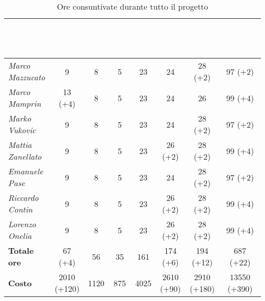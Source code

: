\begin{table}[H]
    \renewcommand\arraystretch{1.4}
    \footnotesize
    \centering
        \begin{tabular}{|l|c|c|c|c|c|c|c|}
            \hline
            \rowcolor[HTML]{036400}
            \textcolor{white}{\textbf{Membro}} & \multicolumn{1}{c|}{\textcolor{white}{\textbf{RE}}} & \multicolumn{1}{c|}{\textcolor{white}{\textbf{AM}}} & \multicolumn{1}{c|}{\textcolor{white}{\textbf{AN}}} & \multicolumn{1}{c|}{\textcolor{white}{\textbf{PT}}} & \multicolumn{1}{c|}{\textcolor{white}{\textbf{PR}}} & \multicolumn{1}{c|}{\textcolor{white}{\textbf{VE}}} & \multicolumn{1}{c|}{\textcolor{white}{\textbf{Totale ore persona}}} \\ \hline
            \rowcolor[HTML]{EFEFEF}\textit{Marco Mazzucato}  & 9             & 8       & 5          & 23           & 24        & 28 (+2)         & 97 (+2)     \\ \hline
            \rowcolor[HTML]{C0C0C0}\textit{Marco Mamprin}    & 13 (+4)       & 8       & 5          & 23           & 24        & 26          & 99 (+4)   \\ \hline
            \rowcolor[HTML]{EFEFEF}\textit{Marko Vukovic}    & 9             & 8       & 5          & 23           & 24        & 28 (+2)       & 97 (+2)       \\ \hline
            \rowcolor[HTML]{C0C0C0}\textit{Mattia Zanellato} & 9             & 8       & 5          & 23           & 26 (+2)   & 28 (+2)          & 99 (+4)   \\ \hline
            \rowcolor[HTML]{EFEFEF}\textit{Emanuele Pase}    & 9             & 8       & 5          & 23           & 24        & 28 (+2)          & 97 (+2)    \\ \hline
            \rowcolor[HTML]{C0C0C0}\textit{Riccardo Contin}  & 9             & 8       & 5          & 23           & 26 (+2)   & 28 (+2)         & 99 (+4)    \\ \hline
            \rowcolor[HTML]{EFEFEF}\textit{Lorenzo Onelia}   & 9             & 8       & 5          & 23           & 26 (+2)   & 28 (+2)          & 99 (+4)    \\ \hline
            \rowcolor[HTML]{C0C0C0}\textbf{Totale ore} & 67 (+4)       & 56      & 35         & 161          & 174 (+6)  & 194 (+12)   & 687 (+22)   \\ \hline
            \rowcolor[HTML]{EFEFEF}\textbf{Costo} &    2010 (+120)     & 1120    & 875        & 4025         & 2610 (+90)  & 2910 (+180)   & 13550 (+390)   \\ \hline
        \end{tabular}
    \caption{Ore consuntivate durante tutto il progetto}
\end{table}

